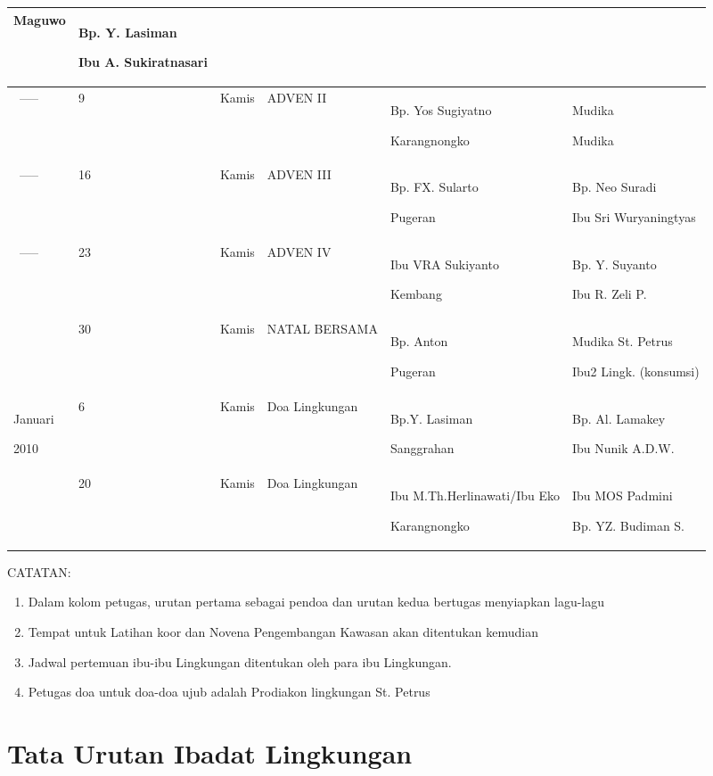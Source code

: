 \documentclass[a5paper,titlepage,11pt]{book}
\begin{document}
\begin{tabular}{|p{1.2cm}|p{0.4cm}|p{0.8cm}|p{2.5cm}|p{3cm}|p{3cm}|}
Maguwo &
Bp. Y. Lasiman

Ibu A. Sukiratnasari\\\hline{~-----}
 &
9 &
Kamis &
ADVEN II &
Bp. Yos Sugiyatno

Karangnongko &
Mudika

Mudika\\\hline{~-----}
 &
16 &
Kamis &
ADVEN III &
Bp. FX. Sularto

Pugeran &
Bp. Neo Suradi

Ibu Sri Wuryaningtyas\\\hline{~-----}
 &
23 &
Kamis &
ADVEN IV &
Ibu VRA Sukiyanto

Kembang &
Bp. Y. Suyanto

Ibu R. Zeli P.\\\hline
\multicolumn{1}{|p{0.9cm}|}{} &
30 &
Kamis &
NATAL BERSAMA &
Bp. Anton

Pugeran &
Mudika St. Petrus

Ibu2 Lingk. (konsumsi)\\\hline
\multicolumn{1}{|p{0.9cm}|}{Januari

2010} &
6 &
Kamis &
Doa Lingkungan &
Bp.Y.  Lasiman

Sanggrahan &
Bp. Al. Lamakey

Ibu Nunik A.D.W.\\\hline
 &
20 &
Kamis &
Doa Lingkungan &
Ibu M.Th.Herlinawati/Ibu Eko

Karangnongko &
Ibu MOS Padmini

Bp. YZ. Budiman S.\\\hline
\end{tabular}
CATATAN: 

\begin{enumerate}
\item Dalam kolom petugas, urutan pertama sebagai pendoa dan urutan kedua bertugas menyiapkan lagu-lagu
\item Tempat untuk Latihan koor dan Novena Pengembangan Kawasan akan ditentukan kemudian
\item Jadwal pertemuan ibu-ibu Lingkungan ditentukan oleh para ibu Lingkungan.
\item Petugas doa untuk doa-doa ujub adalah Prodiakon lingkungan St. Petrus
\end{enumerate}
\normalsize%
\newpage
\section{Tata Urutan Ibadat Lingkungan}
\end{document}
